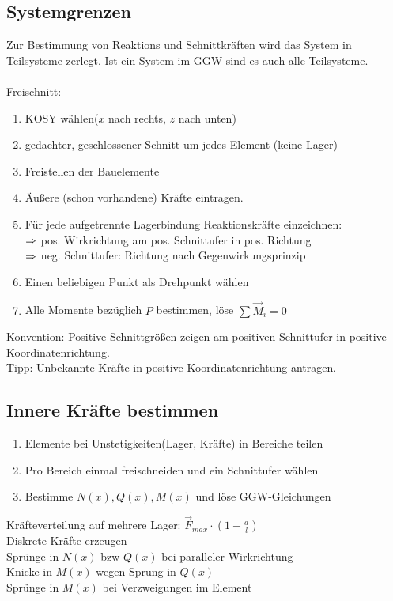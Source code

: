 \documentclass[fs, footer]{latex4ei}
\begin{document}
\begin{multicols}{4}
	\subsection{Systemgrenzen}
	Zur Bestimmung von Reaktions und Schnittkräften wird das System in Teilsysteme zerlegt.
	Ist ein System im GGW sind es auch alle Teilsysteme.\\
	\\
	Freischnitt:\\
	\begin{enumerate}\itemsep0pt 
		\item KOSY wählen($x$ nach rechts, $z$ nach unten)
		\item gedachter, geschlossener Schnitt um jedes Element (keine Lager)
		\item Freistellen der Bauelemente
		\item Äußere (schon vorhandene) Kräfte eintragen.
		\item Für jede aufgetrennte Lagerbindung Reaktionskräfte einzeichnen:\\
				$\Rightarrow$ pos. Wirkrichtung am pos. Schnittufer in pos. Richtung\\
				$\Rightarrow$ neg. Schnittufer: Richtung nach Gegenwirkungsprinzip
		\item Einen beliebigen Punkt als Drehpunkt wählen
		\item Alle Momente bezüglich $P$ bestimmen, löse $\sum \vec M_i = 0$
	\end{enumerate}
	
	Konvention: Positive Schnittgrößen zeigen am positiven Schnittufer in positive Koordinatenrichtung.\\
	Tipp: Unbekannte Kräfte in positive Koordinatenrichtung antragen.\\
	

	\subsection{Innere Kräfte bestimmen}
	\begin{enumerate}
		\item Elemente bei Unstetigkeiten(Lager, Kräfte) in Bereiche teilen
		\item Pro Bereich einmal freischneiden und ein Schnittufer wählen
		\item Bestimme $N(x),Q(x),M(x)$ und löse GGW-Gleichungen
	\end{enumerate}
	Kräfteverteilung auf mehrere Lager: $\vec F_{max} \cdot (1-\frac{a}{l})$\\
	Diskrete Kräfte erzeugen\\ 
	Sprünge in $N(x)$ bzw $Q(x)$ bei paralleler Wirkrichtung\\
	Knicke in $M(x)$ wegen Sprung in $Q(x)$\\
	Sprünge in $M(x)$ bei Verzweigungen im Element\\
	

\end{multicols}
\end{document}
